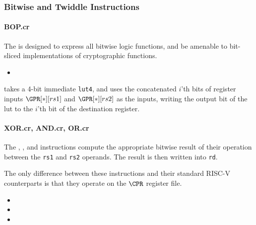 \subsubsection{Bitwise and Twiddle Instructions}

\paragraph{BOP.cr}

The  is designed to express all bitwise logic functions, and be
amenable to bit-sliced implementations of cryptographic functions.

\begin{itemize}
\item {}
\end{itemize}

 takes a 4-bit immediate {\tt lut4}, and uses the concatenated
$i$'th bits of register inputs $\GPR[*][rs1]$ and  $\GPR[*][rs2]$
as the inputs, writing the output bit of the lut to the $i$'th bit of the
destination register.

\paragraph{XOR.cr, AND.cr, OR.cr}

The , , and  instructions compute the
appropriate bitwise result of their operation between the {\tt rs1} and
{\tt rs2} operands. The result is then written into {\tt rd}.


The only difference between these instructions and their standard RISC-V
counterparts is that they operate on the $\CPR$ register file.

\begin{itemize}
\item {}
\item {}
\item {}
\end{itemize}

